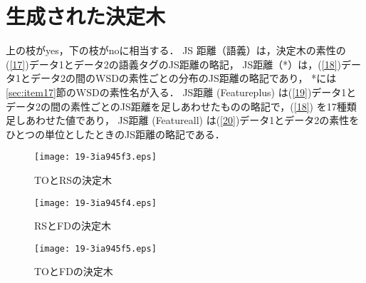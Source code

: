 \documentclass[japanese]{jnlp_1.4}
\begin{document}
\appendix
\section{生成された決定木}
上の枝がyes，下の枝がnoに相当する．
JS 距離（語義）は，決定木の素性の(\ref{17})データ1とデータ2の語義タグのJS距離の略記，
JS距離（*）は，(\ref{18})データ1とデータ2の間のWSDの素性ごとの分布のJS距離の略記であり，
 *には\ref{sec:item17}節のWSDの素性名が入る．
JS距離 (Featureplus) は(\ref{19})データ1とデータ2の間の素性ごとのJS距離を足しあわせたものの略記で，(\ref{18}) を17種類足しあわせた値であり，
JS距離 (Featureall) は(\ref{20})データ1とデータ2の素性をひとつの単位としたときのJS距離の略記である．


\begin{figure}[h]
 \begin{center}
  \texttt{[image: 19-3ia945f3.eps]}
 \end{center}
 \caption{TOとRSの決定木}
\end{figure}
\begin{figure}[h]
 \begin{center}
  \texttt{[image: 19-3ia945f4.eps]}
 \end{center}
 \caption{RSとFDの決定木}
\end{figure}
\begin{figure}[h]
 \begin{center}
  \texttt{[image: 19-3ia945f5.eps]}
 \end{center}
 \caption{TOとFDの決定木}
\end{figure}


\begin{biography}

\end{biography}


\biodate


\clearpage








\clearpage
\end{document}
